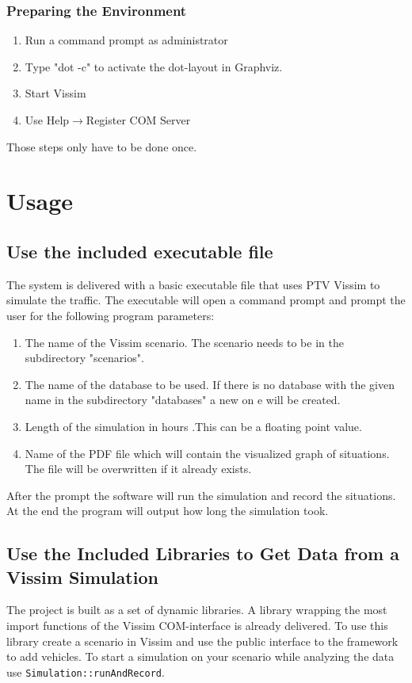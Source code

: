 \documentclass[a4paper, 11pt]{scrreprt}
\begin{document}
	\subsection{Preparing the Environment}
	\begin{enumerate}
		\item Run a command prompt as administrator
		\item Type "dot -c" to activate the dot-layout in Graphviz.
		\item Start Vissim
		\item Use Help$\rightarrow$Register COM Server
	\end{enumerate}
	Those steps only have to be done once.
	
	\chapter{Usage}
	
	\section{Use the included executable file}
	The system is delivered with a basic executable file that uses PTV Vissim to simulate the traffic. The executable will open a command prompt and prompt the user for the following program parameters:
	\begin{enumerate}
		\item The name of the Vissim scenario. The scenario needs to be in the subdirectory "scenarios".
		\item The name of the database to be used. If there is no database with the given name in the subdirectory "databases" a new on e will be created.
		\item Length of the simulation in hours .This can be a floating point value.
		\item Name of the PDF file which will contain the  visualized graph of situations. The file will be overwritten if it already exists.
	\end{enumerate}
	After the prompt the software will run the simulation and record the situations. At the end the program will output how long the simulation took.
	
	\section{Use the Included Libraries to Get Data from a Vissim Simulation}
	The project is built as a set of dynamic libraries.
	A library wrapping the most import functions of the Vissim COM-interface is already delivered.
	To use this library create a scenario in Vissim and use the public interface to the framework to add vehicles.
	To start a simulation on your scenario while analyzing the data use \verb+Simulation::runAndRecord+.
	
\end{document}
